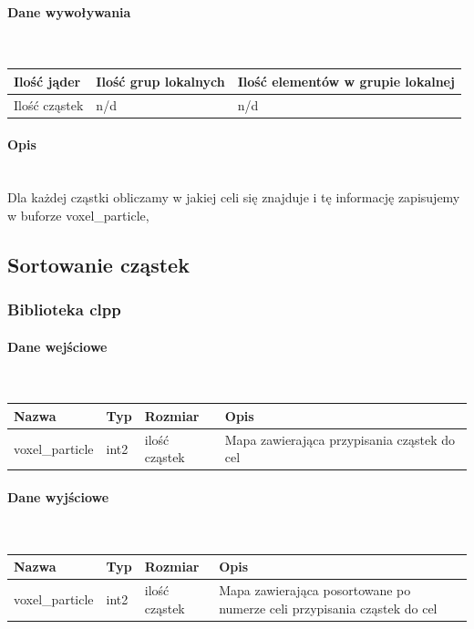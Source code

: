 \documentclass[polish, 12pt]{aghthesis}
\begin{document}
			\paragraph{Dane wywoływania} \ \\
				\begin{tabular}{| p{} | p{} | p{}|}
				\hline
					Ilość jąder & Ilość grup lokalnych & Ilość elementów w grupie lokalnej \\
				\hline
					Ilość cząstek & n/d & n/d \\ 
				\hline
				\end{tabular}
			\paragraph{Opis} \ \\
				\indent Dla każdej cząstki obliczamy w jakiej celi się znajduje i tę informację zapisujemy w buforze voxel\_particle,
		\subsection{Sortowanie cząstek}
			\subsubsection{Biblioteka clpp}
			\paragraph{Dane wejściowe} \ \\
				\begin{tabular}{| p{} | p{} | p{} | p{} |}
				\hline
					Nazwa & Typ & Rozmiar & Opis \\
				\hline
					voxel\_particle & int2 & ilość cząstek & Mapa zawierająca przypisania cząstek do cel \\ 
				\hline
				\end{tabular}
			\paragraph{Dane wyjściowe} \ \\
				\begin{tabular}{| p{} | p{} | p{} | p{} |}
				\hline
					Nazwa & Typ & Rozmiar & Opis \\
				\hline
					voxel\_particle & int2 & ilość cząstek & Mapa zawierająca posortowane po numerze celi przypisania cząstek do cel\\ 
				\hline
				\end{tabular}
\end{document}
